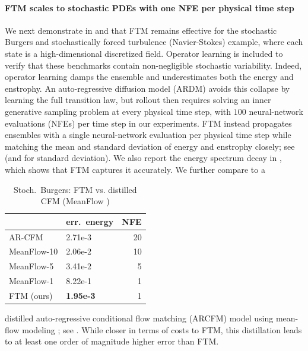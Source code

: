 \documentclass[oneside,11pt]{article}
\theoremstyle{remark}
\begin{document}
\paragraph{FTM scales to stochastic PDEs with one NFE per physical time step}
We next demonstrate in  and  that FTM remains effective for the stochastic Burgers and stochastically forced turbulence (Navier-Stokes) example, where each state is a high-dimensional discretized field. Operator learning is included to verify that these benchmarks contain non-negligible stochastic variability. Indeed, operator learning damps the ensemble and underestimates both the energy and enstrophy. An auto-regressive diffusion model (ARDM) \cite{KOHL2026108641} avoids this collapse by learning the full transition law, but rollout then requires solving an inner generative sampling problem at every physical time step, with $100$ neural-network evaluations (NFEs) per time step in our experiments. FTM instead propagates ensembles with a single neural-network evaluation per physical time step while matching the mean and standard deviation of energy and enstrophy closely; see  (and  for standard deviation). 
We also report the energy spectrum decay in , which shows that FTM captures it accurately. We further compare to a\begin{table}
\small  \centering\caption{Stoch.\ Burgers: FTM vs. distilled CFM (MeanFlow \cite{geng2025mean})}\label{tab:MeanFlow}
  \hspace*{-0.25cm}\begin{tabular}{llr}
    & \hspace*{-0.3cm}err.\ energy & \hspace*{-0.2cm}NFE \\
    \hline
    AR-CFM \cite{albergo-vanden-eijnden:2022,lipman2023flow} & \hspace*{-0.3cm}2.71e-3& \hspace*{-0.2cm}20\\
    MeanFlow-10 \cite{geng2025mean} & \hspace*{-0.3cm}2.06e-2 & \hspace*{-0.2cm}10\\
    MeanFlow-5 \cite{geng2025mean}& \hspace*{-0.3cm}3.41e-2& \hspace*{-0.2cm}5\\
    MeanFlow-1\cite{geng2025mean} & \hspace*{-0.3cm}8.22e-1& 1\\
    FTM (ours) & \hspace*{-0.3cm}\textbf{1.95e-3}& \hspace*{-0.2cm}1
  \end{tabular}
\end{table} distilled auto-regressive conditional flow matching (ARCFM) model \cite{albergo-vanden-eijnden:2022,lipman2023flow} using mean-flow modeling \cite{geng2025mean}; see . While closer in terms of costs to FTM, this distillation leads to at least one order of magnitude higher error than FTM. 
\end{document}
